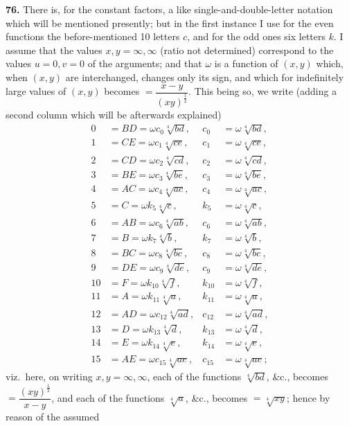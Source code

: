 \documentclass[11pt]{article}
\begin{document}
\medskip
\textbf{76.} There is, for the constant factors, a like single-and-double-letter notation which will be mentioned presently; but in the first instance I use for the even functions the before-mentioned 10 letters $c$, and for the odd ones six letters $k$. I assume that the values $x, y = \infty, \infty$ (ratio not determined) correspond to the values $u=0, v=0$ of the arguments; and that $\omega$ is a function of $(x,y)$ which, when $(x,y)$ are interchanged, changes only its sign, and which for indefinitely large values of $(x,y)$ becomes $= \dfrac{x-y}{(xy)^{\frac{1}{2}}}$. This being so, we write (adding a second column which will be afterwards explained)
\[
\begin{aligned}
0 &= BD = \omega c_0\sqrt[4]{bd}, & c_0 &= \omega \sqrt[4]{bd},\\
1 &= CE = \omega c_1\sqrt[4]{ce}, & c_1 &= \omega \sqrt[4]{ce},\\
2 &= CD = \omega c_2\sqrt[4]{cd}, & c_2 &= \omega \sqrt[4]{cd},\\
3 &= BE = \omega c_3\sqrt[4]{be}, & c_3 &= \omega \sqrt[4]{be},\\
4 &= AC = \omega c_4\sqrt[4]{ac}, & c_4 &= \omega \sqrt[4]{ac},\\
5 &= C = \omega k_5\sqrt[4]{c}, & k_5 &= \omega \sqrt[4]{c},\\
6 &= AB = \omega c_6\sqrt[4]{ab}, & c_6 &= \omega \sqrt[4]{ab},\\
7 &= B = \omega k_7\sqrt[4]{b}, & k_7 &= \omega \sqrt[4]{b},\\
8 &= BC = \omega c_8\sqrt[4]{bc}, & c_8 &= \omega \sqrt[4]{bc},\\
9 &= DE = \omega c_9\sqrt[4]{de}, & c_9 &= \omega \sqrt[4]{de},\\
10 &= F = \omega k_{10}\sqrt[4]{f}, & k_{10} &= \omega \sqrt[4]{f},\\
11 &= A = \omega k_{11}\sqrt[4]{a}, & k_{11} &= \omega \sqrt[4]{a},\\
12 &= AD = \omega c_{12}\sqrt[4]{ad}, & c_{12} &= \omega \sqrt[4]{ad},\\
13 &= D = \omega k_{13}\sqrt[4]{d}, & k_{13} &= \omega \sqrt[4]{d},\\
14 &= E = \omega k_{14}\sqrt[4]{e}, & k_{14} &= \omega \sqrt[4]{e},\\
15 &= AE = \omega c_{15}\sqrt[4]{ae}, & c_{15} &= \omega \sqrt[4]{ae};
\end{aligned}
\]
viz.\ here, on writing $x, y = \infty, \infty$, each of the functions $\sqrt[4]{bd}$, \&c., becomes $= \dfrac{(xy)^{\frac{1}{2}}}{x-y}$, and each of the functions $\sqrt[4]{a}$, \&c., becomes $= \sqrt[4]{xy}$; hence by reason of the assumed
\end{document}
